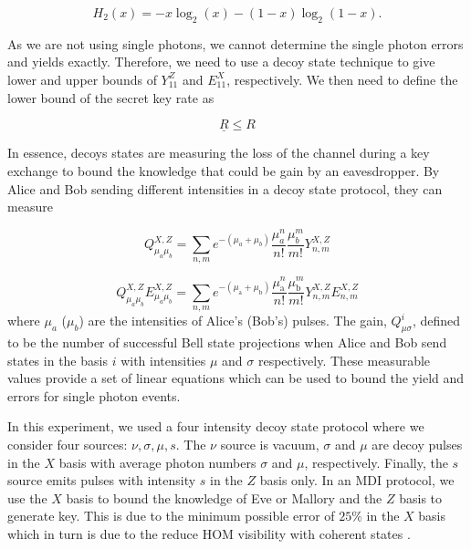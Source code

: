 \begin{equation}
	H_2(x) = -x \log_2(x) - (1-x) \log_2(1-x).
\end{equation}


As we are not using single photons, we cannot determine the single photon errors and yields exactly. Therefore, we need to use a decoy state technique \cite{Lo2005} to give lower and upper bounds of $Y_{11}^Z$ and $E_{11}^X$, respectively. We then need to define the lower bound of the secret key rate as

\begin{equation}
	\underline{R} \leq R
\end{equation}

In essence, decoys states are measuring the loss of the channel during a key exchange to bound the knowledge that could be gain by an eavesdropper.  By Alice and Bob sending different intensities in a decoy state protocol, they can measure

\begin{equation}
	Q_{\mu_a \mu_b}^{X, Z} = \sum_{n,m} e^{-(\mu_a + \mu_b)}\frac{\mu_a^n}{n!}\frac{\mu_b^m}{m!} Y_{n,m}^{X, Z}
\end{equation}

\begin{equation}
	Q_{\mu_{a} \mu_{b}}^{X, Z} E^{X, Z}_{\mu_{a} \mu_{b}}=\sum_{n, m} e^{-\left(\mu_{\mathrm{a}}+\mu_{\mathrm{b}}\right)} \frac{\mu_{\mathrm{a}}^{n}}{n !} \frac{\mu_{\mathrm{b}}^{m}}{m !} Y^{X, Z}_{n, m} E^{X, Z}_{n, m}
\end{equation}
where $\mu_a$ ($\mu_b$) are the intensities of Alice's (Bob's) pulses. The gain, $Q_{\mu\sigma}^i$, defined to be the number of successful Bell state projections when Alice and Bob send states in the basis $i$ with intensities $\mu$ and $\sigma$ respectively. These measurable values provide a set of linear equations which can be used to bound the yield and errors for single photon events.

In this experiment, we used a four intensity decoy state protocol \cite{zhou2016} where we consider four sources: $\nu, \sigma, \mu, s$. The $\nu$ source is vacuum, $\sigma$ and $\mu$ are decoy pulses in the $X$ basis with average photon numbers $\sigma$ and $\mu$, respectively. Finally, the $s$ source emits pulses with intensity $s$ in the $Z$ basis only. In an \ac{MDI} protocol, we use the $X$ basis to bound the knowledge of Eve or Mallory and the $Z$ basis to generate key. This is due to the minimum possible error of $25\%$ in the $X$ basis \cite{Rubenok2013} which in turn is due to the reduce \ac{HOM} visibility with coherent states \cite{Rarity2005}.

